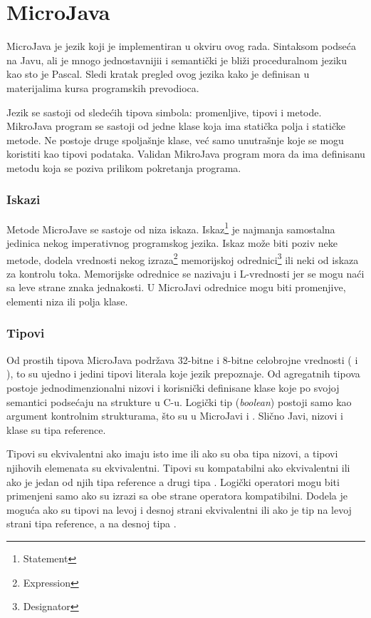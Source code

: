 
\chapter{MicroJava}
\label{ch:microjava}

MicroJava je jezik koji je implementiran u okviru ovog rada. 
Sintaksom podseća na Javu, ali je mnogo jednostavnijii i semantički je bliži proceduralnom jeziku kao sto je Pascal. 
Sledi kratak pregled ovog jezika kako je definisan u materijalima kursa programskih prevodioca.

Jezik se sastoji od sledećih tipova simbola: promenljive, tipovi i metode. 
MikroJava program se sastoji od jedne klase koja ima statička polja i statičke metode. 
Ne postoje druge spoljašnje klase, već samo unutrašnje koje se mogu koristiti kao tipovi podataka. 
Validan  MikroJava program mora da ima definisanu metodu  koja se poziva prilikom pokretanja programa.

\subsection*{Iskazi}

Metode MicroJave se sastoje od niza iskaza. 
Iskaz\footnote{\eng Statement} 
	je najmanja samostalna jedinica nekog imperativnog programskog jezika. 
Iskaz može biti poziv neke metode, dodela vrednosti nekog izraza\footnote{\eng Expression} 
	memorijskoj odrednici\footnote{\eng Designator} 
	ili neki od iskaza za kontrolu toka. 
Memorijske odrednice se nazivaju i L-vrednosti jer se mogu naći sa leve strane znaka jednakosti. 
U MicroJavi odrednice mogu biti promenjive, elementi niza ili polja klase.

\subsection*{Tipovi}

Od prostih tipova MicroJava podržava 32-bitne i 8-bitne celobrojne vrednosti ( i ), 
	to su ujedno i jedini tipovi literala koje jezik prepoznaje. 
Od agregatnih tipova postoje jednodimenzionalni nizovi i korisnički definisane klase koje po svojoj semantici podsećaju na strukture u C-u. 
Logički tip (\textit{boolean}) postoji samo kao argument kontrolnim strukturama, što su u MicroJavi  i . 
Slično Javi, nizovi i klase su tipa reference.

Tipovi su ekvivalentni ako imaju isto ime ili ako su oba tipa nizovi, a tipovi njihovih elemenata su ekvivalentni. 
Tipovi su kompatabilni ako ekvivalentni ili ako je jedan od njih tipa reference a drugi tipa . 
Logički operatori mogu biti primenjeni samo ako su izrazi sa obe strane operatora kompatibilni. 
Dodela je moguća ako su tipovi na levoj i desnoj strani ekvivalentni ili ako je tip na levoj strani tipa reference, a na desnoj tipa .

